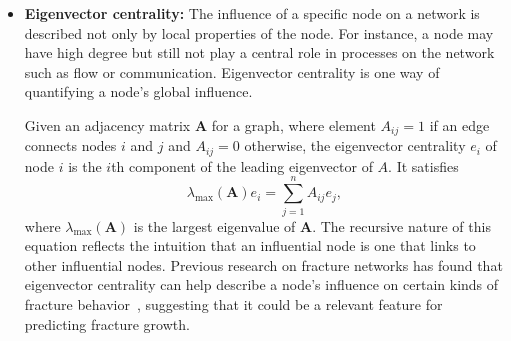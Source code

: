 \begin{itemize}
    
    \item \textbf{Eigenvector centrality:} The influence of a specific node on a network is described not only by local properties of the node.  For instance, a node may have high degree but still not play a central role in processes on the network such as flow or communication.  Eigenvector centrality is one way of quantifying a node's global influence.
    
    Given an adjacency matrix $\mathbf{A}$ for a graph, where element $A_{ij}=1$ if an edge connects nodes $i$ and $j$ and $A_{ij}=0$ otherwise, the eigenvector centrality $e_i$ of node $i$ is the $i$th component of the leading eigenvector of $A$.  It satisfies
    \begin{equation}
    \lambda_{\max}(\mathbf{A}) e_i = \sum_{j=1}^n A_{ij}e_j,
    \end{equation}
    where $\lambda_{\max}(\mathbf{A})$ is the largest eigenvalue of $\mathbf{A}$.  The recursive nature of this equation reflects the intuition that an influential node is one that links to other influential nodes.  Previous research on fracture networks has found that eigenvector centrality can help describe a node's influence on certain kinds of fracture behavior~\cite{santiago2016,valera2018machine}, suggesting that it could be a relevant feature for predicting fracture growth.
    
    
    

\end{itemize}
